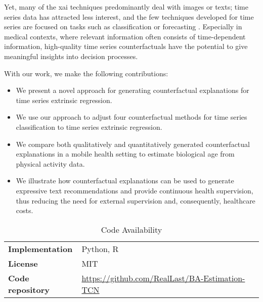 Yet, many of the \gls{xai} techniques predominantly deal with images or texts; time series data has attracted less interest, and the few techniques developed for time series are focused on tasks such as classification or forecasting \cite{theissler_explainable_2022}.     Especially in medical contexts, where relevant information often consists of time-dependent information, high-quality time series counterfactuals have the potential to give meaningful insights into decision processes.

With our work, we make the following contributions:
\begin{itemize}
    \item We present a novel approach for generating counterfactual explanations for time series extrinsic regression.
    \item We use our approach to adjust four counterfactual methods for time series classification to time series extrinsic regression.
    \item We compare both qualitatively and quantitatively generated counterfactual explanations in a mobile health setting to estimate biological age from physical activity data.
    \item We illustrate how counterfactual explanations can be used to generate expressive text recommendations and provide continuous health supervision, thus reducing the need for external supervision and, consequently, healthcare costs.
\end{itemize}

\begin{table}[h!t]
\caption{Code Availability}
\label{tab:introduction:code_and_website}
\centering
\renewcommand*{\arraystretch}{1.4}
\begin{tabularx}{\columnwidth}{l|X}
\hline
\textbf{Implementation} & Python, R\\
\textbf{License} & MIT \\
\textbf{Code repository} & \url{https://github.com/RealLast/BA-Estimation-TCN}\\
\hline
\end{tabularx}
\end{table}

